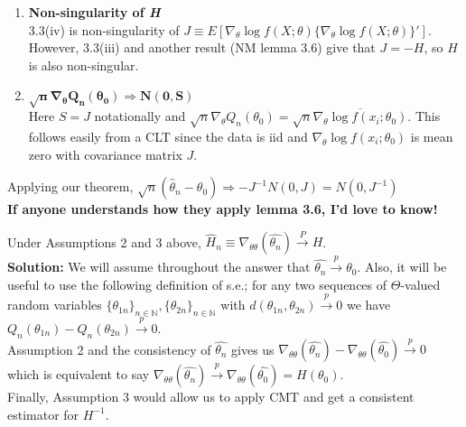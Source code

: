 \documentclass[11pt,letterpaper]{article}                  %
\begin{document}
\begin{problem}
\begin{enumerate}
\item \textbf{Non-singularity of \textit{H}} \\
3.3(iv) is non-singularity of $J \equiv E[\nabla_{\theta} \log
f(X;\theta) \{\nabla_{\theta} \log f(X;\theta)\}']$. However, 3.3(iii)
and another result (NM lemma 3.6) give that $J = -H$, so $H$ is also
non-singular.

\item $\mathbf{\sqrt{n}\nabla_{\theta}Q_n(\theta_0) \Rightarrow
    N(0,S)}$ \\
  Here $S= J$ notationally and
  $\sqrt{n}\nabla_{\theta}Q_n(\theta_0) = \sqrt{n}
  \overline{\nabla_{\theta}\log f(x_i; \theta_0)}$. This follows
  easily from a CLT since the data is iid and
  $\nabla_{\theta}\log f(x_i; \theta_0)$ is mean zero with covariance
  matrix $J$.
\end{enumerate}
Applying our theorem, $\sqrt{n}(\hat{\theta}_n - \theta_0) \Rightarrow
-J^{-1} N(0, J) = N(0, J^{-1})$ \\


\textbf{If anyone understands how they apply lemma 3.6, I'd love to know!}


\end{problem}

\bigskip
\begin{problem}
\end{problem}

\bigskip
\begin{problem}
Under Assumptions 2 and 3 above, $\hat{H}_n \equiv \nabla_{\theta\theta}(\widehat{\theta_n}) \overset{P}{\rightarrow} H$.\\

\textbf{Solution:} We will assume throughout the answer that $\widehat{\theta_n}\overset{p}{\rightarrow}\theta_0$. Also, it will be useful to use the following definition of s.e.; for any two sequences of $\Theta$-valued random variables $\{\theta_{1n}\}_{n\in\mathbb{N}}, \{\theta_{2n}\}_{n\in\mathbb{N}}$ with $d(\theta_{1n},\theta_{2n})\overset{p}{\rightarrow}0$ we have $Q_n(\theta_{1n}) - Q_n(\theta_{2n})\overset{p}{\rightarrow}0$.\\

Assumption 2 and the consistency of $\widehat{\theta_n}$ gives us $\nabla_{\theta\theta}(\widehat{\theta_n}) - \nabla_{\theta\theta}(\widehat{\theta_0}) \overset{p}{\rightarrow}0$ which is equivalent to say $\nabla_{\theta\theta}(\widehat{\theta_n}) \overset{p}{\rightarrow} \nabla_{\theta\theta}(\widehat{\theta_0}) = H(\theta_0)$.\\

Finally, Assumption 3 would allow us to apply CMT and get a consistent estimator for $H^{-1}$.
\end{problem}
\end{document}

